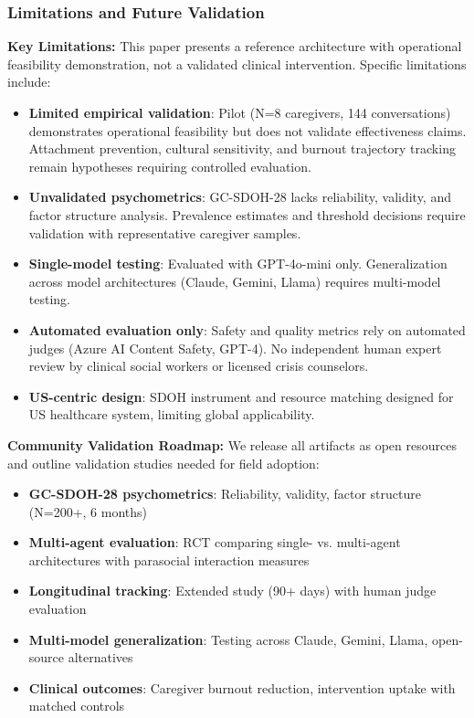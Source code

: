 \documentclass{article}
\begin{document}
\subsubsection{Limitations and Future Validation}

\textbf{Key Limitations:} This paper presents a reference architecture with operational feasibility demonstration, not a validated clinical intervention. Specific limitations include:

\begin{itemize}
    \item \textbf{Limited empirical validation}: Pilot (N=8 caregivers, 144 conversations) demonstrates operational feasibility but does not validate effectiveness claims. Attachment prevention, cultural sensitivity, and burnout trajectory tracking remain hypotheses requiring controlled evaluation.
    \item \textbf{Unvalidated psychometrics}: GC-SDOH-28 lacks reliability, validity, and factor structure analysis. Prevalence estimates and threshold decisions require validation with representative caregiver samples.
    \item \textbf{Single-model testing}: Evaluated with GPT-4o-mini only. Generalization across model architectures (Claude, Gemini, Llama) requires multi-model testing.
    \item \textbf{Automated evaluation only}: Safety and quality metrics rely on automated judges (Azure AI Content Safety, GPT-4). No independent human expert review by clinical social workers or licensed crisis counselors.
    \item \textbf{US-centric design}: SDOH instrument and resource matching designed for US healthcare system, limiting global applicability.
\end{itemize}

\textbf{Community Validation Roadmap:} We release all artifacts as open resources and outline validation studies needed for field adoption:

\begin{itemize}
    \item \textbf{GC-SDOH-28 psychometrics}: Reliability, validity, factor structure (N=200+, 6 months)
    \item \textbf{Multi-agent evaluation}: RCT comparing single- vs. multi-agent architectures with parasocial interaction measures
    \item \textbf{Longitudinal tracking}: Extended study (90+ days) with human judge evaluation
    \item \textbf{Multi-model generalization}: Testing across Claude, Gemini, Llama, open-source alternatives
    \item \textbf{Clinical outcomes}: Caregiver burnout reduction, intervention uptake with matched controls
\end{itemize}
\end{document}
